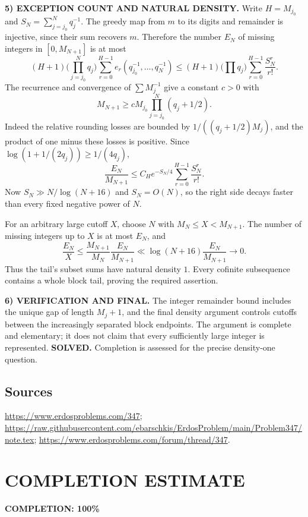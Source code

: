 \noindent\textbf{5) EXCEPTION COUNT AND NATURAL DENSITY.}
Write $H=M_{j_0}$ and $S_N=\sum_{j=j_0}^{N}q_j^{-1}$. The greedy map from $m$ to its digits and remainder is injective, since their sum recovers $m$. Therefore the number $E_N$ of missing integers in $[0,M_{N+1}]$ is at most
\[
 (H+1)\Big(\prod_{j=j_0}^{N}q_j\Big)
 \sum_{r=0}^{H-1}e_r(q_{j_0}^{-1},\ldots,q_N^{-1})
 \le(H+1)\Big(\prod q_j\Big)\sum_{r=0}^{H-1}\frac{S_N^r}{r!}.
\]
The recurrence and convergence of $\sum M_j^{-1}$ give a constant $c>0$ with
\[
 M_{N+1}\ge cM_{j_0}\prod_{j=j_0}^{N}(q_j+1/2).
\]
Indeed the relative rounding losses are bounded by
$1/((q_j+1/2)M_j)$, and the product of one minus these losses is positive. Since
$\log(1+1/(2q_j))\ge1/(4q_j)$,
\[
 \frac{E_N}{M_{N+1}}
 \le C_H e^{-S_N/4}\sum_{r=0}^{H-1}\frac{S_N^r}{r!}.
\]
Now $S_N\gg N/\log(N+16)$ and $S_N=O(N)$, so the right side decays faster than every fixed negative power of $N$.

For an arbitrary large cutoff $X$, choose $N$ with $M_N\le X<M_{N+1}$. The number of missing integers up to $X$ is at most $E_N$, and
\[
 \frac{E_N}{X}\le\frac{M_{N+1}}{M_N}\frac{E_N}{M_{N+1}}
 \ll\log(N+16)\frac{E_N}{M_{N+1}}\longrightarrow0.
\]
Thus the tail's subset sums have natural density $1$. Every cofinite subsequence contains a whole block tail, proving the required assertion.

\noindent\textbf{6) VERIFICATION AND FINAL.}
The integer remainder bound includes the unique gap of length $M_j+1$, and the final density argument controls cutoffs between the increasingly separated block endpoints. The argument is complete and elementary; it does not claim that every sufficiently large integer is represented.
\textbf{SOLVED.} Completion is assessed for the precise density-one question.

\subsection*{Sources}
\url{https://www.erdosproblems.com/347}; \url{https://raw.githubusercontent.com/ebarschkis/ErdosProblem/main/Problem347/note.tex}; \url{https://www.erdosproblems.com/forum/thread/347}.

\section{COMPLETION ESTIMATE}
\textbf{COMPLETION: 100\%}

